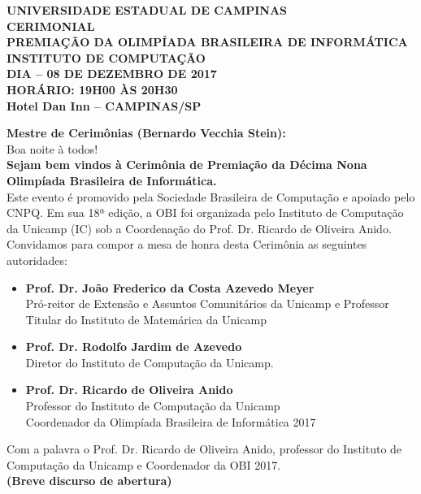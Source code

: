 \documentclass{article}
\begin{document}
\setlength{\parindent}{0pt}

\begin{center}
    \textbf{
        UNIVERSIDADE ESTADUAL DE CAMPINAS\\
        CERIMONIAL\\
        \bigskip
         PREMIAÇÃO DA OLIMPÍADA BRASILEIRA DE INFORMÁTICA\\
        INSTITUTO DE COMPUTAÇÃO\\
        DIA – 08 DE DEZEMBRO DE 2017\\
        HORÁRIO: 19H00 ÀS 20H30\\
        Hotel Dan Inn – CAMPINAS/SP 
    }
\end{center}

\textbf{Mestre de Cerimônias (Bernardo Vecchia Stein):}\\
Boa noite à todos!\\
\textbf{Sejam bem vindos à Cerimônia de Premiação da Décima Nona Olimpíada Brasileira de Informática.}\\
\color{blue}Este evento é promovido pela Sociedade Brasileira de Computação e apoiado pelo CNPQ. Em sua 18ª edição, a OBI foi organizada pelo Instituto de Computação da Unicamp (IC) sob a Coordenação do Prof. Dr. Ricardo de Oliveira Anido.\\
\color{black}
Convidamos para compor a mesa de honra desta Cerimônia as seguintes autoridades:
\begin{itemize}
\item \textbf{Prof. Dr. João Frederico da Costa Azevedo Meyer}\\
Pró-reitor de Extensão e Assuntos Comunitários da Unicamp e Professor\\
Titular do Instituto de Matemárica da Unicamp
\item \textbf{Prof. Dr. Rodolfo Jardim de Azevedo}\\
Diretor do Instituto de Computação da Unicamp.
\item \textbf{Prof. Dr. Ricardo de Oliveira Anido}\\
Professor do Instituto de Computação da Unicamp\\
Coordenador da Olimpíada Brasileira de Informática 2017
\end{itemize}

Com a palavra o Prof. Dr. Ricardo de Oliveira Anido, professor do Instituto de Computação da Unicamp e Coordenador da OBI 2017.\\
\color{red}\textbf{(Breve discurso de abertura)}\color{black}\\
\end{document}
